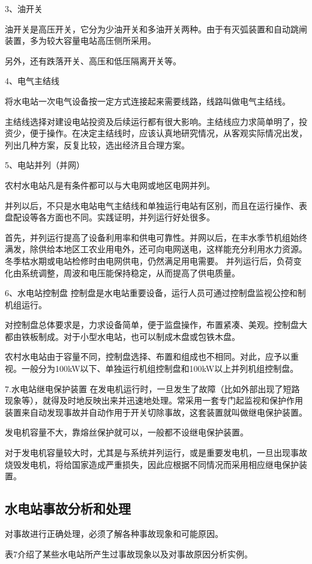 \documentclass{ctexbook}
\begin{document}
3、油开关

油开关是高压开关，它分为少油开关和多油开关两种。由于有灭弧装置和自动跳闸装置，多为较大容量电站高压侧所采用。

另外，还有跌落开关、高压和低压隔离开关等。

4、电气主结线

将水电站一次电气设备按一定方式连接起来需要线路，线路叫做电气主结线。

主结线选择对建设电站投资及后续运行都有很大影响。主结线应力求简单明了，投资少，便于操作。在决定主结线时，应该认真地研究情况，从客观实际情况出发，列出几种方案，反复比较，选出经济且合理方案。

5、电站并列（并网）

农村水电站凡是有条件都可以与大电网或地区电网并列。

并列以后，不只是水电站电气主结线和单独运行电站有区别，而且在运行操作、表盘配设等各方面也不同。实践证明，并列运行好处很多。

首先，并列运行提高了设备利用率和供电可靠性。并网以后，在丰水季节机组始终满发，除供给本地区工农业用电外，还可向电网送电，这样能充分利用水力资源。冬季枯水期或电站检修时由电网供电，仍然满足用电需要。
并列运行后，负荷变化由系统调整，周波和电压能保持稳定，从而提高了供电质量。

6、水电站控制盘
控制盘是水电站重要设备，运行人员可通过控制盘监视公控和制机组运行。

对控制盘总体要求是，力求设备简单，便于监盘操作，布置紧凑、美观。控制盘大都由铁板制成。对于小型水电站，也可以制成木盘或包铁木盘。

农村水电站由于容量不同，控制盘选择、布置和组成也不相同。对此，应予以重视。一般分为100kW以下、单独运行机组控制盘和100kW以上并列机组控制盘。

7.水电站继电保护装置
在发电机运行时，一旦发生了故障（比如外部出现了短路现象等），就得及时地反映出来并迅速地处理。常采用一套专门起监视和保护作用装置来自动发现事故并自动作用于开关切除事故，这套装置就叫做继电保护装置。

发电机容量不大，靠熔丝保护就可以，一般都不设继电保护装置。

对于发电机容量较大时，尤其是与系统并列运行，或是重要发电机，一旦出现事故烧毁发电机，将给国家造成严重损失，因此应根据不同情况而采用相应继电保护装置。
\subsection{水电站事故分析和处理}
对事故进行正确处理，必须了解各种事故现象和可能原因。

表7介绍了某些水电站所产生过事故现象以及对事故原因分析实例。
\end{document}
